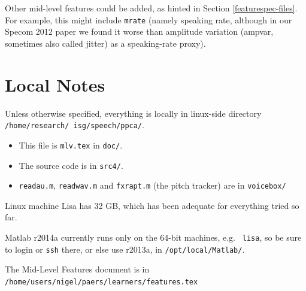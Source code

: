 \documentclass[11pt]{article}
\begin{document}
Other mid-level features could be added, as hinted in Section
\ref{featurespec-files}.  For example, this might include {\tt mrate}
(namely speaking rate, although in our Specom 2012 paper we found it
worse than amplitude variation (ampvar, sometimes also called jitter)
as a speaking-rate proxy).

%


\section{Local Notes}

Unless otherwise specified, everything is
  locally in linux-side directory {\tt
    /home/research/ isg/speech/ppca/}.

\begin{itemize} \setlength{\itemsep}{0pt} \setlength{\parskip}{0pt}
\item   This file is {\tt mlv.tex} in {\tt doc/}.
\item  The source code is in {\tt src4/}.
\item {\tt readau.m}, {\tt readwav.m} and {\tt fxrapt.m} (the pitch
  tracker) are in {\tt voicebox/}
\end{itemize}


Linux machine Lisa has 32 GB, which has been adequate for everything
tried so far.

Matlab r2014a currently runs only on the 64-bit machines, e.g. {\tt
  lisa}, so be sure to login or {\tt ssh} there, or else use r2013a,
in {\tt /opt/local/Matlab/}.

The Mid-Level Features document is in
{\tt /home/users/nigel/paers/learners/features.tex}




\end{document}
